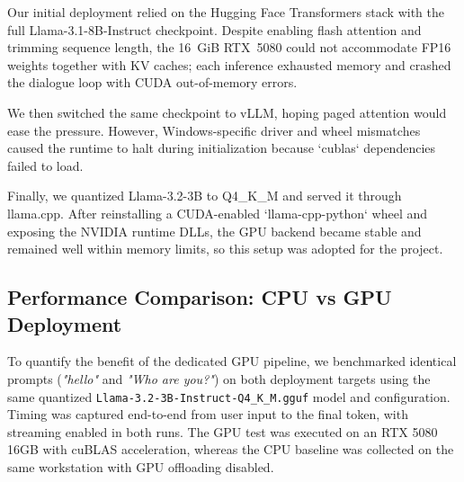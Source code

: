 \documentclass[12pt,a4paper]{article}
\begin{document}
Our initial deployment relied on the Hugging Face Transformers stack with the full Llama-3.1-8B-Instruct checkpoint. Despite enabling flash attention and trimming sequence length, the 16~GiB RTX~5080 could not accommodate FP16 weights together with KV caches; each inference exhausted memory and crashed the dialogue loop with CUDA out-of-memory errors.

We then switched the same checkpoint to vLLM, hoping paged attention would ease the pressure. However, Windows-specific driver and wheel mismatches caused the runtime to halt during initialization because `cublas` dependencies failed to load.

Finally, we quantized Llama-3.2-3B to Q4\_K\_M and served it through llama.cpp. After reinstalling a CUDA-enabled `llama-cpp-python` wheel and exposing the NVIDIA runtime DLLs, the GPU backend became stable and remained well within memory limits, so this setup was adopted for the project.



\subsection{Performance Comparison: CPU vs GPU Deployment}

To quantify the benefit of the dedicated GPU pipeline, we benchmarked identical prompts (\textit{"hello"} and \textit{"Who are you?"}) on both deployment targets using the same quantized \texttt{Llama-3.2-3B-Instruct-Q4\_K\_M.gguf} model and configuration. Timing was captured end-to-end from user input to the final token, with streaming enabled in both runs. The GPU test was executed on an RTX 5080 16GB with cuBLAS acceleration, whereas the CPU baseline was collected on the same workstation with GPU offloading disabled.
\end{document}
